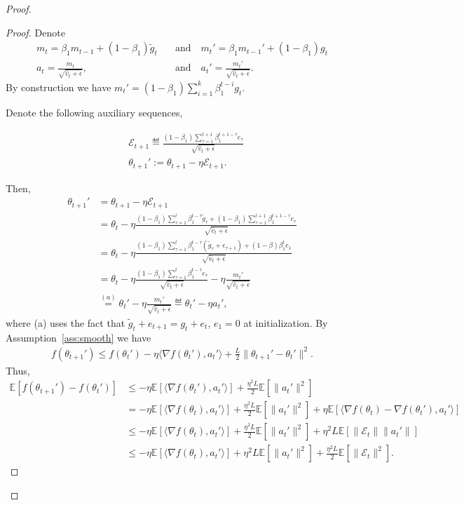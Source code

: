 \documentclass[11pt]{article}
\begin{document}
\begin{proof}
\begin{proof}
Denote
\begin{align*}
m_t=\beta_1 m_{t-1}+(1-\beta_1)\tilde g_t \quad & \textrm{and} \quad m_t'=\beta_1 m_{t-1}'+(1-\beta_1) g_t\\
    a_t=\frac{m_t}{\sqrt{\hat v_t+\epsilon}},\quad & \textrm{and} \quad  a_t'=\frac{m_t'}{\sqrt{\hat v_t+\epsilon}}.
\end{align*}
By construction we have $m_t'=(1-\beta_1)\sum_{i=1}^k\beta_1^{t-i} g_t$. 

Denote the following auxiliary sequences,

\begin{align*}
& \mathcal E_{t+1}\eqdef \frac{(1-\beta_1)\sum_{\tau=1}^{t+1} \beta_1^{t+1-\tau} e_\tau}{\sqrt{\hat v_t+\epsilon}}\\
&\theta_{t+1}':=\theta_{t+1}-\eta\mathcal E_{t+1}.
\end{align*}

Then, 
\begin{align*}
    \theta_{t+1}'&=\theta_{t+1}-\eta\mathcal E_{t+1}\\
    &=\theta_t-\eta\frac{(1-\beta_1)\sum_{\tau=1}^{t} \beta_1^{t-\tau}\tilde g_\tau+(1-\beta_1)\sum_{\tau=1}^{t+1} \beta_1^{t+1-\tau}e_\tau}{\sqrt{\hat v_t+\epsilon}}\\
    &=\theta_t-\eta\frac{(1-\beta_1)\sum_{\tau=1}^{t} \beta_1^{t-\tau}(\tilde g_\tau+e_{\tau+1})+(1-\beta)\beta_1^t e_1}{\sqrt{\hat v_t+\epsilon}}\\
    &=\theta_t-\eta\frac{(1-\beta_1)\sum_{\tau=1}^{t} \beta_1^{t-\tau} e_\tau}{\sqrt{\hat v_t+\epsilon}}-\eta\frac{m_t'}{\sqrt{\hat v_t+\epsilon}}\\
    &\overset{(a)}{=}\theta_t'-\eta\frac{m_t'}{\sqrt{\hat v_t+\epsilon}}\eqdef \theta_t'-\eta a_t',
\end{align*}
where (a) uses the fact that $\tilde g_t+e_{t+1}=g_t+e_t$, $e_1=0$ at initialization. By Assumption~\ref{ass:smooth} we have
\begin{align*}
    f(\theta_{t+1}')\leq f(\theta_t')-\eta\langle \nabla f(\theta_t'), a_t'\rangle+\frac{L}{2}\| \theta_{t+1}'-\theta_t'\|^2.
\end{align*}
Thus,
\begin{align}
    \mathbb E[f(\theta_{t+1}')-f(\theta_t')]&\leq -\eta\mathbb E[\langle \nabla f(\theta_t'), a_t'\rangle]+\frac{\eta^2L}{2}\mathbb E[\|a_t'\|^2] \nonumber\\
    &=-\eta\mathbb E[\langle \nabla f(\theta_t), a_t'\rangle]+\frac{\eta^2L}{2}\mathbb E[\|a_t'\|^2]+\eta\mathbb E[\langle \nabla f(\theta_t)-\nabla f(\theta_t'),a_t'\rangle] \nonumber\\
    &\leq -\eta\mathbb E[\langle \nabla f(\theta_t), a_t'\rangle]+\frac{\eta^2L}{2}\mathbb E[\|a_t'\|^2]+\eta^2 L\mathbb E[\| \mathcal E_t\| \|a_t'\|] \nonumber\\
    &\leq -\eta\mathbb E[\langle \nabla f(\theta_t), a_t'\rangle]+\eta^2L \mathbb E[\|a_t'\|^2]+\frac{\eta^2 L}{2}\mathbb E[\| \mathcal E_t\|^2]. \label{eq0}
\end{align}


\end{proof}
\end{proof}
\end{document}
